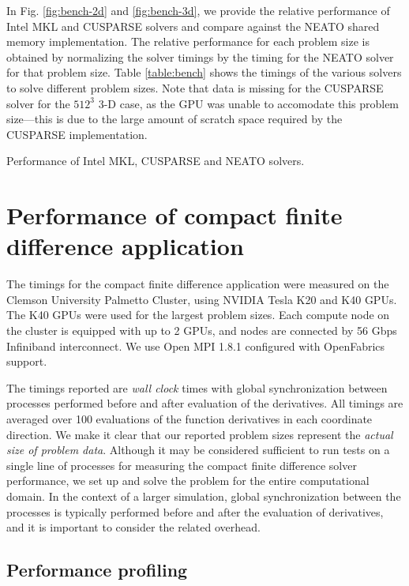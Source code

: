 In Fig. \ref{fig:bench-2d} and \ref{fig:bench-3d},
we provide the relative performance of
Intel MKL and CUSPARSE solvers and compare against
the NEATO shared memory implementation.
The relative performance for
each problem size is obtained by
normalizing the solver timings
by the timing for the NEATO solver for that problem size.
Table \ref{table:bench} shows the timings of the various
solvers to solve different problem sizes.
Note that data is missing for the CUSPARSE solver
for the $512^3$ 3-D case,
as the GPU was unable to accomodate this problem size---this
is due to the large amount of scratch space required
by the CUSPARSE implementation.

\begin{sidewaystable}[]
\scriptsize
\centering
\caption{Performance of Intel MKL, CUSPARSE and NEATO solvers.}
\label{table:bench}

\end{sidewaystable}

\section{Performance of compact finite difference application}

The timings for the
compact finite difference application
were measured on the
Clemson University Palmetto Cluster,
using NVIDIA Tesla K20 and K40 GPUs.
The K40 GPUs were used for the largest problem sizes.
Each compute node on the cluster is equipped with up to 2 GPUs,
and nodes are connected by 56 Gbps Infiniband interconnect.
We use Open MPI 1.8.1 configured with OpenFabrics support.

The timings reported are \emph{wall clock} times
with global synchronization between processes performed 
before and after evaluation of the derivatives.
All timings are averaged over 100 evaluations of the function derivatives
in each coordinate direction.
We make it clear that our reported
problem sizes represent the \emph{actual size of problem data}.
Although it may be considered sufficient to
run tests on a single line of processes
for measuring the compact finite difference solver performance,
we set up and solve the problem for the entire computational domain.
In the context of a larger simulation,
global synchronization between the processes
is typically performed before and after the evaluation of derivatives,
and it is important to consider the related overhead.

\subsection{Performance profiling}

